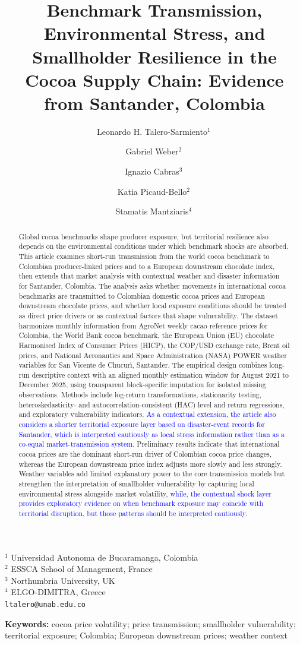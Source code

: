 \documentclass[11pt]{article}
\title{Benchmark Transmission, Environmental Stress, and Smallholder Resilience in the Cocoa Supply Chain: Evidence from Santander, Colombia}
\author{
Leonardo H. Talero-Sarmiento$^{1}$\,\orcidlink{0000-0002-4129-9163} \and
Gabriel Weber$^{2}$\,\orcidlink{0000-0003-2120-1648} \and
Ignazio Cabras$^{3}$\,\orcidlink{0000-0002-3418-8553} \and
Katia Picaud-Bello$^{2}$\,\orcidlink{0000-0001-7538-0210} \and
Stamatis Mantziaris$^{4}$\,\orcidlink{0000-0001-7047-1447}
}
\date{}
\newcommand{\vTwo}[1]{\textcolor{blue}{#1}}
\begin{document}
\maketitle
\begin{center}
\small
$^{1}$ Universidad Autonoma de Bucaramanga, Colombia \\ 
$^{2}$ ESSCA School of Management, France \\
$^{3}$ Northumbria University, UK \\
$^{4}$ ELGO-DIMITRA, Greece \\
\texttt{ltalero@unab.edu.co}
\end{center}

\begin{abstract}
Global cocoa benchmarks shape producer exposure, but territorial resilience also depends on the environmental conditions under which benchmark shocks are absorbed. This article examines short-run transmission from the world cocoa benchmark to Colombian producer-linked prices and to a European downstream chocolate index, then extends that market analysis with contextual weather and disaster information for Santander, Colombia. The analysis asks whether movements in international cocoa benchmarks are transmitted to Colombian domestic cocoa prices and European downstream chocolate prices, and whether local exposure conditions should be treated as direct price drivers or as contextual factors that shape vulnerability. The dataset harmonizes monthly information from AgroNet weekly cacao reference prices for Colombia, the World Bank cocoa benchmark, the European Union (EU) chocolate Harmonised Index of Consumer Prices (HICP), the COP/USD exchange rate, Brent oil prices, and National Aeronautics and Space Administration (NASA) POWER weather variables for San Vicente de Chucur\'{\i}, Santander. The empirical design combines long-run descriptive context with an aligned monthly estimation window for August 2021 to December 2025, using transparent block-specific imputation for isolated missing observations. Methods include log-return transformations, stationarity testing, heteroskedasticity- and autocorrelation-consistent (HAC) level and return regressions, and exploratory vulnerability indicators. \vTwo{As a contextual extension, the article also considers a shorter territorial exposure layer based on disaster-event records for Santander, which is interpreted cautiously as local stress information rather than as a co-equal market-transmission system.} Preliminary results indicate that international cocoa prices are the dominant short-run driver of Colombian cocoa price changes, whereas the European downstream price index adjusts more slowly and less strongly. Weather variables add limited explanatory power to the core transmission models but strengthen the interpretation of smallholder vulnerability by capturing local environmental stress alongside market volatility, \vTwo{while, the contextual shock layer provides exploratory evidence on when benchmark exposure may coincide with territorial disruption, but those patterns should be interpreted cautiously.}
\end{abstract}
\textbf{Keywords:} cocoa price volatility; price transmission; smallholder vulnerability; territorial exposure; Colombia; European downstream prices; weather context
\end{document}
